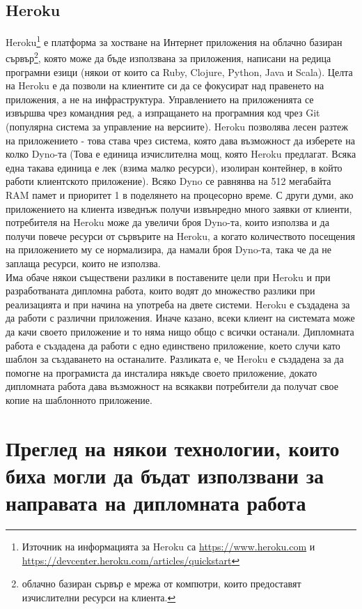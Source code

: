 \documentclass[pdftex,12pt,a4paper]{report}
\begin{document}
\subsection {Heroku}
Heroku\footnote{Източник на информацията за Heroku са \url{https://www.heroku.com} и \\\url{https://devcenter.heroku.com/articles/quickstart}} е платформа за хостване на Интернет приложения на облачно базиран сървър\footnote{облачно базиран сървър е мрежа от компютри, които предоставят изчислителни ресурси на клиента.}, която може да бъде използвана за приложения, написани на редица програмни езици (някои от които са Ruby, Clojure, Python, Java и Scala). Целта на Heroku е да позволи на клиентите си да се фокусират над правенето на приложения, а не на инфраструктура. Управлението на приложенията се извършва чрез командния ред, а изпращането на програмния код чрез Git (популярна система за управление на версиите). Heroku позволява лесен разтеж на приложението - това става чрез система, която дава възможност да изберете на колко Dyno-та (Това е единица изчислителна мощ, която Heroku предлагат. Всяка една такава единица е лек (взима малко ресурси), изолиран контейнер, в който работи клиентското приложение). Всяко Dyno се равнянва на 512 мегабайта RAM памет и приоритет 1 в поделянето на процесорно време. С други думи, ако приложението на клиента изведнъж получи извънредно много заявки от клиенти, потребителя на Heroku може да увеличи броя Dyno-та, които използва и да получи повече ресурси от сървърите на Heroku, а когато количеството посещения на приложението му се нормализира, да намали броя Dyno-та, така че да не заплаща ресурси, които не използва.\\
Има обаче някои съществени разлики в поставените цели при Heroku и при разработваната дипломна работа, които водят до множество разлики при реализацията и при начина на употреба на двете системи. Heroku е създадена за да работи с различни приложения. Иначе казано, всеки клиент на системата може да качи своето приложение и то няма нищо общо с всички останали. Дипломната работа е създадена да работи с едно единствено приложение, което случи като шаблон за създаването на останалите. Разликата е, че Heroku е създадена за да помогне на програмиста да инсталира някъде своето приложение, докато дипломната работа дава възможност на всякакви потребители да получат свое копие на шаблонното приложение.
\section {Преглед на някои технологии, които биха могли да бъдат използвани за направата на дипломната работа}
\end{document}
